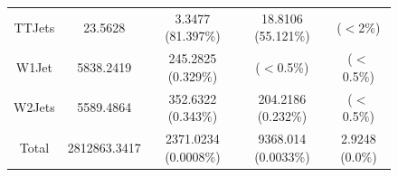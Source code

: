 \begin{figure}[H]
{\begin{tabular}{c|c|c|c|c}
                         TTJets & 23.5628 & 3.3477 (81.397\%) & 18.8106 (55.121\%) & ($<$2\%) \\
                         W1Jet & 5838.2419 & 245.2825 (0.329\%) & ($<$0.5\%) & ($<$0.5\%) \\
                         W2Jets & 5589.4864 & 352.6322 (0.343\%) & 204.2186 (0.232\%) & ($<$0.5\%) \\ \hline
                         Total & 2812863.3417 & 2371.0234 (0.0008\%) & 9368.014 (0.0033\%) & 2.9248 (0.0\%) \\ \hline
                \end{tabular}}
        \label{tab:Continuum_Background_Yield_Table}
\end{figure}

\newpage 

